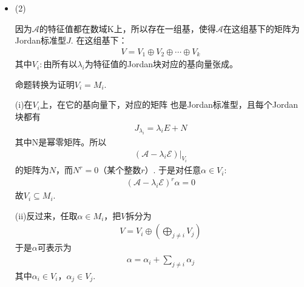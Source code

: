 \documentclass{article}
\begin{document}
\begin{itemize}
        故$\mathscr{A} \alpha \in M_i$，所以$M_i$是不变子空间。
  \item (2)

        因为$\mathscr{A}$的特征值都在数域K上，所以存在一组基，使得$\mathscr{A}$在这组基下的矩阵为Jordan标准型$J$.
        在这组基下：
        \begin{align*}
          V = V_1 \oplus V_2 \oplus \cdots \oplus V_k
        \end{align*}
        其中$V_i:$由所有以$\lambda_i$为特征值的Jordan块对应的基向量张成。

        命题转换为证明$V_i = M_i$.

        (i)在$V_i$上，在它的基向量下，对应的矩阵
        也是Jordan标准型，且每个Jordan块都有
        \begin{align*}
          J_{\lambda_i} = \lambda_i E + N
        \end{align*}
        其中N是幂零矩阵。所以
        \begin{align*}
          (\mathscr{A} - \lambda_i \mathscr{E}) \big|_{V_i}
        \end{align*}
        的矩阵为$N$，而$N^r = 0$（某个整数$r$）.
        于是对任意$\alpha \in V_i$:
        \begin{align*}
          (\mathscr{A} - \lambda_i \mathscr{E})^r \alpha = 0
        \end{align*}
        故$V_i \subseteq M_i$.

        (ii)反过来，任取$\alpha \in M_i$，把$V$拆分为
        \begin{align*}
          V = V_i \oplus \left( \bigoplus \limits_{j \neq i} V_j \right)
        \end{align*}
        于是$\alpha$可表示为
        \begin{align*}
          \alpha = \alpha_i + \sum\limits_{j \neq i} \alpha_j
        \end{align*}
        其中$\alpha_i \in V_i$，$\alpha_j \in V_j$.


\end{itemize}
\end{document}
